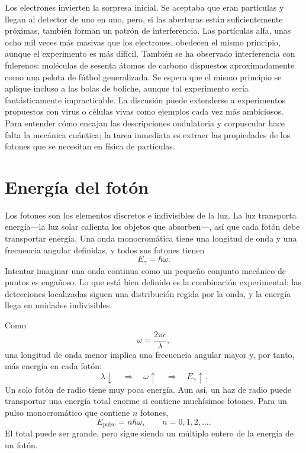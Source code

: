 Los electrones invierten la sorpresa inicial. Se aceptaba que eran partículas y llegan al detector de uno en uno, pero, si las aberturas están suficientemente próximas, también forman un patrón de interferencia. Las partículas alfa, unas ocho mil veces más masivas que los electrones, obedecen el mismo principio, aunque el experimento es más difícil. También se ha observado interferencia con fulerenos: moléculas de sesenta átomos de carbono dispuestos aproximadamente como una pelota de fútbol generalizada. Se espera que el mismo principio se aplique incluso a las bolas de boliche, aunque tal experimento sería fantásticamente impracticable. La discusión puede extenderse a experimentos propuestos con virus o células vivas como ejemplos cada vez más ambiciosos. Para entender cómo encajan las descripciones ondulatoria y corpuscular hace falta la mecánica cuántica; la tarea inmediata es extraer las propiedades de los fotones que se necesitan en física de partículas.

\section{Energía del fotón}

Los fotones son los elementos discretos e indivisibles de la luz. La luz transporta energía---la luz solar calienta los objetos que absorben---, así que cada fotón debe transportar energía. Una onda monocromática tiene una longitud de onda y una frecuencia angular definidas, y todos sus fotones tienen
\begin{equation}
E_\gamma=\hbar\omega.
\end{equation}
Intentar imaginar una onda continua como un pequeño conjunto mecánico de puntos es engañoso. Lo que está bien definido es la combinación experimental: las detecciones localizadas siguen una distribución regida por la onda, y la energía llega en unidades indivisibles.

Como
\begin{equation}
\omega=\frac{2\pi c}{\lambda},
\end{equation}
una longitud de onda menor implica una frecuencia angular mayor y, por tanto, más energía en cada fotón:
\begin{equation}
\lambda\downarrow
\quad\Longrightarrow\quad
\omega\uparrow
\quad\Longrightarrow\quad
E_\gamma\uparrow.
\end{equation}
Un solo fotón de radio tiene muy poca energía. Aun así, un haz de radio puede transportar una energía total enorme si contiene muchísimos fotones. Para un pulso monocromático que contiene \(n\) fotones,
\begin{equation}
E_{\text{pulse}}=n\hbar\omega,
\qquad
n=0,1,2,\ldots.
\end{equation}
El total puede ser grande, pero sigue siendo un múltiplo entero de la energía de un fotón.


